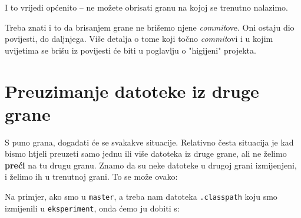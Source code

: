 I to vrijedi općenito -- ne možete obrisati granu na kojoj se trenutno nalazimo.

Treba znati i to da brisanjem grane ne brišemo njene \emph{commit}ove.
Oni ostaju dio povijesti, do daljnjega.
Više detalja o tome koji točno \emph{commit}ovi i u kojim uvijetima se brišu iz povijesti će biti u poglavlju o "higijeni" projekta.

\section*{Preuzimanje datoteke iz druge grane}

S puno grana, događati će se svakakve situacije.
Relativno česta situacija je kad bismo htjeli preuzeti samo jednu ili više datoteka iz druge grane, ali ne želimo \textbf{preći} na tu drugu granu.
Znamo da su neke datoteke u drugoj grani izmijenjeni, i želimo ih u trenutnoj grani.
To se može ovako:


Na primjer, ako smo u \verb+master+, a treba nam datoteka \verb+.classpath+ koju smo izmijenili u \verb+eksperiment+, onda ćemo ju dobiti s:


